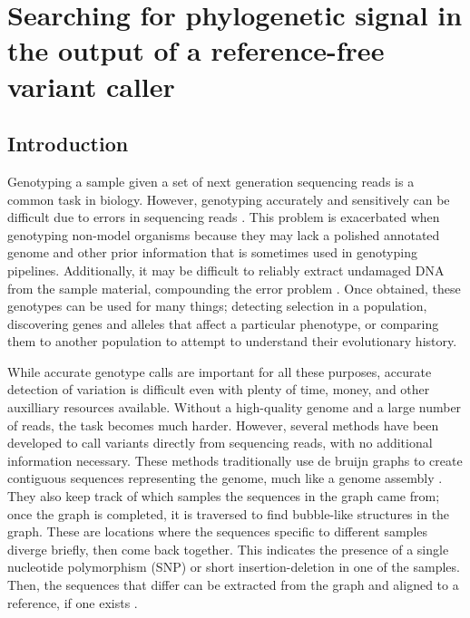 \chapter{Searching for phylogenetic signal in the output of a reference-free variant caller}
\label{ch:structured}
\newpage
\section{Introduction}

Genotyping a sample given a set of next generation sequencing reads is a common task in biology. However, genotyping accurately and sensitively can be difficult due to errors in sequencing reads \parencite{fox_accuracy_2014, pfeifer_next-generation_2017, wu_estimating_2017}. This problem is exacerbated when genotyping non-model organisms because they may lack a polished annotated genome and other prior information that is sometimes used in genotyping pipelines. Additionally, it may be difficult to reliably extract undamaged DNA from the sample material, compounding the error problem \parencite{da_fonseca_next-generation_2016}. Once obtained, these genotypes can be used for many things; detecting selection in a population, discovering genes and alleles that affect a particular phenotype, or comparing them to another population to attempt to understand their evolutionary history.

While accurate genotype calls are important for all these purposes, accurate detection of variation is difficult even with plenty of time, money, and other auxilliary resources available. Without a high-quality genome and a large number of reads, the task becomes much harder. However, several methods have been developed to call variants directly from sequencing reads, with no additional information necessary. These methods traditionally use de bruijn graphs to create contiguous sequences representing the genome, much like a genome assembly \parencite{leggett_reference-free_2014}. They also keep track of which samples the sequences in the graph came from; once the graph is completed, it is traversed to find bubble-like structures in the graph. These are locations where the sequences specific to different samples diverge briefly, then come back together. This indicates the presence of a single nucleotide polymorphism (SNP) or short insertion-deletion in one of the samples. Then, the sequences that differ can be extracted from the graph and aligned to a reference, if one exists \parencite{iqbal_novo_2012, uricaru_reference-free_2015}.

